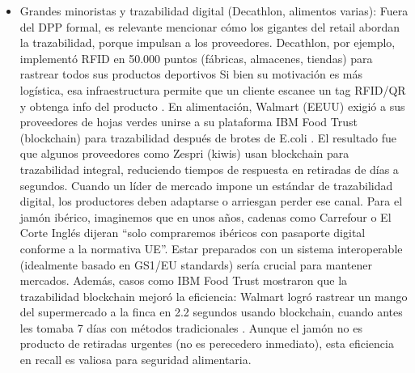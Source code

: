\begin{itemize}
\begin{enumerate}
\end{enumerate}
    \item Grandes minoristas y trazabilidad digital (Decathlon, alimentos varias): Fuera del DPP formal, es relevante mencionar cómo los gigantes del retail abordan la trazabilidad, porque impulsan a los proveedores. Decathlon, por ejemplo, implementó RFID en 50.000 puntos (fábricas, almacenes, tiendas) para rastrear todos sus productos deportivos  Si bien su motivación es más logística, esa infraestructura permite que un cliente escanee un tag RFID/QR y obtenga info del producto \cite{noauthor_decathlon_nodate}. En alimentación, Walmart (EEUU) exigió a sus proveedores de hojas verdes unirse a su plataforma IBM Food Trust (blockchain) para trazabilidad después de brotes de E.coli \cite{noauthor_how_nodate}. El resultado fue que algunos proveedores como Zespri (kiwis) usan blockchain para trazabilidad integral, reduciendo tiempos de respuesta en retiradas de días a segundos. Cuando un líder de mercado impone un estándar de trazabilidad digital, los productores deben adaptarse o arriesgan perder ese canal. Para el jamón ibérico, imaginemos que en unos años, cadenas como Carrefour o El Corte Inglés dijeran “solo compraremos ibéricos con pasaporte digital conforme a la normativa UE”. Estar preparados con un sistema interoperable (idealmente basado en GS1/EU standards) sería crucial para mantener mercados. Además, casos como IBM Food Trust mostraron que la trazabilidad blockchain mejoró la eficiencia: Walmart logró rastrear un mango del supermercado a la finca en 2.2 segundos usando blockchain, cuando antes les tomaba 7 días con métodos tradicionales \cite{noauthor_how_nodate}. Aunque el jamón no es producto de retiradas urgentes (no es perecedero inmediato), esta eficiencia en recall es valiosa para seguridad alimentaria.

\end{itemize}
